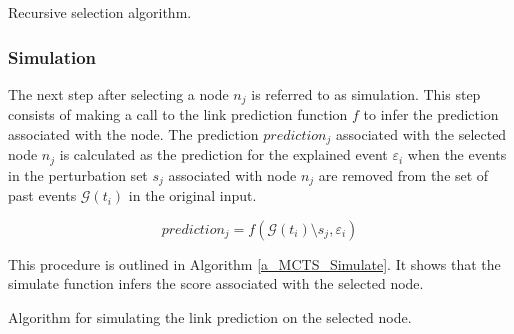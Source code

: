 {
\setlength{\algomargin}{1.25em}
\small
\begin{algorithm}[ht]
\caption{Recursive selection algorithm.}
\label{a_MCTS_Select}
\end{algorithm}
}

\FloatBarrier
\subsubsection{Simulation}
\label{s_Methodology_CoDy_Simulation}
The next step after selecting a node $n_j$ is referred to as simulation. This step consists of making a call to the link prediction function $f$ to infer the prediction associated with the node. The prediction $prediction_j$ associated with the selected node $n_j$ is calculated as the prediction for the explained event $\varepsilon_i$ when the events in the perturbation set $s_j$ associated with node $n_j$ are removed from the set of past events $\mathcal{G}(t_i)$ in the original input. 

\begin{equation}
    prediction_j = f(\mathcal{G}(t_i) \setminus s_j, \varepsilon_i)
\end{equation}

This procedure is outlined in Algorithm \ref{a_MCTS_Simulate}. It shows that the simulate function infers the score associated with the selected node. %

{
\setlength{\algomargin}{1.25em}
\small
\begin{algorithm}[ht]
\caption{Algorithm for simulating the link prediction on the selected node.}
\label{a_MCTS_Simulate}
\end{algorithm}
}

